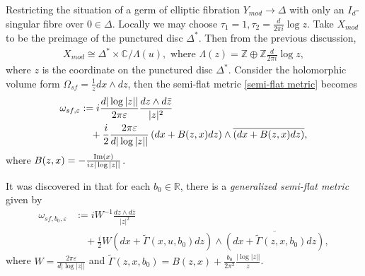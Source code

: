 \documentclass[11pt]{amsart}
\theoremstyle{plain}
\theoremstyle{definition}
\newtheorem{rk}[thm]{Remark}
\numberwithin{equation}{section}
\renewcommand{\epsilon}{\varepsilon}
\begin{document}
Restricting the situation of a germ of elliptic fibration $Y_{mod}\rightarrow \Delta$ with only an $I_d$-singular fibre over $0\in\Delta$. Locally we may choose $\tau_1=1, \tau_2=\frac{d}{2\pi i}\log{z}$. Take $X_{mod}$ to be the preimage of the punctured disc $\Delta^*$. Then from the previous discussion,
\begin{align*}
	X_{mod}\cong  \Delta^*\times \mathbb{C}/\Lambda(u), \mbox{ where } \Lambda(z)=\mathbb{Z}\oplus \mathbb{Z}\frac{d}{2\pi i}\log{z},
\end{align*} where $z$ is the coordinate on the punctured disc $\Delta^*$. Consider the holomorphic volume form ${\Omega}_{sf}=\frac{1}{z}dx\wedge dz$, then the semi-flat metric \eqref{semi-flat metric} becomes
\begin{align}\label{sf metric}
	{\omega}_{sf,\epsilon} &:=  i \frac{d|\log|z||}{2\pi\epsilon}\frac{dz\wedge d\bar{z}}{|z|^2} \notag \\
	&\quad + \frac{i}{2} \frac{2\pi\epsilon}{d|\log|z||} \left(dx+B(z,x)dz\right)\wedge \overline{\left(dx+B(z,x)dz\right)},
\end{align} where $B(z,x) = -\frac{{\rm Im}(x)}{iz|\log|z||}$.  

It was discovered in \cite[Section 2]{CJL2} that for each $b_0\in \mathbb{R}$, there is a {\it generalized semi-flat metric} given by 
\begin{align*}
	{\omega}_{sf, b_0, \epsilon} &:= i W^{-1}\frac{dz\wedge d\bar{z}}{|z|^2}\\
	&\quad + \frac{i}{2} W  \left(dx+\widetilde{\Gamma}(x,u,b_0) dz\right) \wedge \overline{\left(dx+\widetilde{\Gamma}(z,x,b_0) dz\right)},
\end{align*} where $W= \frac{2\pi \epsilon}{d|\log|z||}$ and $
\widetilde{\Gamma}(z,x,b_0) = B(z,x)+ \frac{b_0}{2\pi^2}\frac{|\log|z||}{z}$. 
\end{document}
